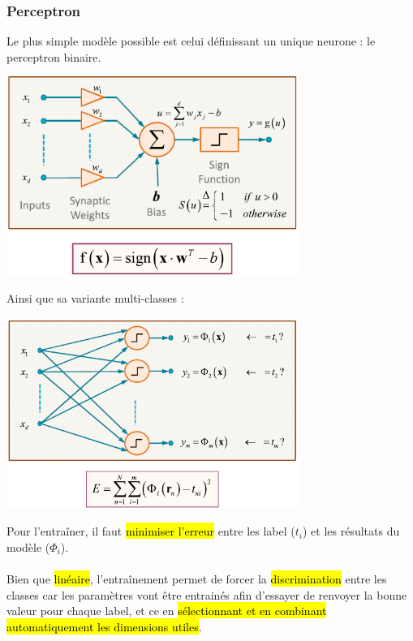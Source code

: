 \documentclass[letterpaper, 12pt]{article}
\newcommand{\alinea}{
\hspace*{0.5cm}}
\begin{document}
			\subsubsection{Perceptron}
				\alinea Le plus simple modèle possible est celui définissant un unique neurone : le perceptron binaire.
					\begin{center}
						\includegraphics[width=3.75in]{Images/neuron}
					\end{center}
				\alinea Ainsi que sa variante multi-classes : 
					\begin{center}
						\includegraphics[width=3.75in]{Images/neuron2}
					\end{center}
					Pour l'entraîner, il faut \hl{minimiser l'erreur} entre les label ($t_i$) et les résultats du modèle ($\Phi_i$).\\
				~\\
				\alinea Bien que \hl{linéaire}, l'entraînement permet de forcer la \hl{discrimination} entre les classes car les paramètres
					vont être entrainés afin d'essayer de renvoyer la bonne valeur pour chaque label, et ce en \hl{sélectionnant et en
					combinant automatiquement les dimensions utiles}.
\end{document}
